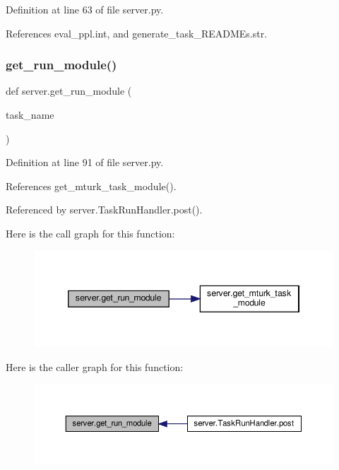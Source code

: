 Definition at line 63 of file server.\+py.



References eval\+\_\+ppl.\+int, and generate\+\_\+task\+\_\+\+R\+E\+A\+D\+M\+Es.\+str.

\mbox{\label{namespaceserver_a19d9a32c8654358136f27ac2f710208d}} 
\subsubsection{\texorpdfstring{get\+\_\+run\+\_\+module()}{get\_run\_module()}}
{\footnotesize\ttfamily def server.\+get\+\_\+run\+\_\+module (\begin{DoxyParamCaption}\item[{}]{task\+\_\+name }\end{DoxyParamCaption})}



Definition at line 91 of file server.\+py.



References get\+\_\+mturk\+\_\+task\+\_\+module().



Referenced by server.\+Task\+Run\+Handler.\+post().

Here is the call graph for this function\+:
\nopagebreak
\begin{figure}[H]
\begin{center}
\leavevmode
\includegraphics[width=346pt]{namespaceserver_a19d9a32c8654358136f27ac2f710208d_cgraph}
\end{center}
\end{figure}
Here is the caller graph for this function\+:
\nopagebreak
\begin{figure}[H]
\begin{center}
\leavevmode
\includegraphics[width=350pt]{namespaceserver_a19d9a32c8654358136f27ac2f710208d_icgraph}
\end{center}
\end{figure}
\mbox{\label{namespaceserver_a6d1c10ed8aa5d27e61ed9db6b4274261}} 
